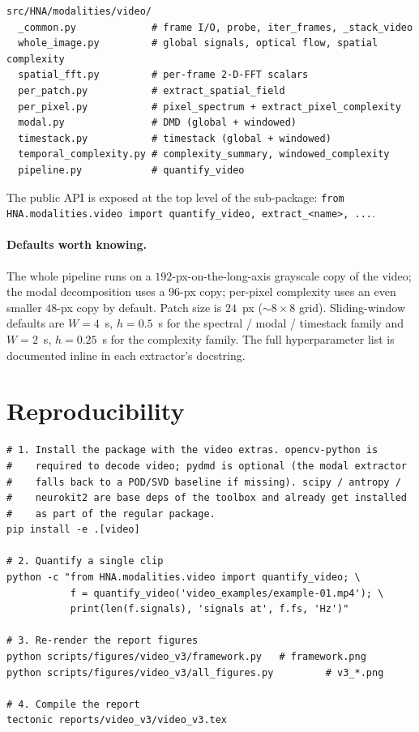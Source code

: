 \documentclass[11pt,a4paper]{article}
\newcommand{\code}[1]{\texttt{\small #1}}
\begin{document}
\begin{lstlisting}
src/HNA/modalities/video/
  _common.py             # frame I/O, probe, iter_frames, _stack_video
  whole_image.py         # global signals, optical flow, spatial complexity
  spatial_fft.py         # per-frame 2-D-FFT scalars
  per_patch.py           # extract_spatial_field
  per_pixel.py           # pixel_spectrum + extract_pixel_complexity
  modal.py               # DMD (global + windowed)
  timestack.py           # timestack (global + windowed)
  temporal_complexity.py # complexity_summary, windowed_complexity
  pipeline.py            # quantify_video
\end{lstlisting}

The public API is exposed at the top level of the sub-package:
\code{from HNA.modalities.video import quantify\_video, extract\_<name>, ...}.

\paragraph{Defaults worth knowing.}
The whole pipeline runs on a $192$-px-on-the-long-axis grayscale copy
of the video; the modal decomposition uses a $96$-px copy; per-pixel
complexity uses an even smaller $48$-px copy by default. Patch size
is $24$~px ($\sim\!8\!\times\!8$ grid). Sliding-window defaults are
$W = 4$~s, $h = 0.5$~s for the spectral / modal / timestack family
and $W = 2$~s, $h = 0.25$~s for the complexity family. The full
hyperparameter list is documented inline in each extractor's
docstring.

\section*{Reproducibility}

\begin{lstlisting}
# 1. Install the package with the video extras. opencv-python is
#    required to decode video; pydmd is optional (the modal extractor
#    falls back to a POD/SVD baseline if missing). scipy / antropy /
#    neurokit2 are base deps of the toolbox and already get installed
#    as part of the regular package.
pip install -e .[video]

# 2. Quantify a single clip
python -c "from HNA.modalities.video import quantify_video; \
           f = quantify_video('video_examples/example-01.mp4'); \
           print(len(f.signals), 'signals at', f.fs, 'Hz')"

# 3. Re-render the report figures
python scripts/figures/video_v3/framework.py   # framework.png
python scripts/figures/video_v3/all_figures.py         # v3_*.png

# 4. Compile the report
tectonic reports/video_v3/video_v3.tex
\end{lstlisting}
\end{document}
